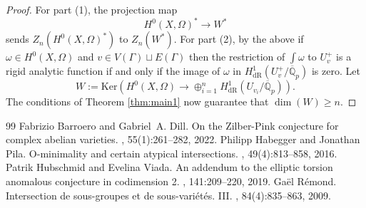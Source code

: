 \documentclass[10pt,a4paper]{amsart}
\newcommand{\Ker}{\mathrm{Ker}}
\def\Q{\mathbb Q}
\newcommand{\dR}{\mathrm{dR}}
\begin{document}
\begin{proof}
For part (1), the projection map
\[
H^0 (X,\Omega )^* \to W^*
\]
sends $Z_n (H^0 (X,\Omega )^* )$ to $Z_n (W^* )$. For part (2), by the above if $\omega \in H^0 (X,\Omega )$ and $v\in V(\Gamma )\sqcup E(\Gamma )$ then the restriction of $\int \omega $ to $U_v ^+$ is a rigid analytic function if and only if the image of $\omega $ in $H^1 _{\dR}(U_v ^+ /\overline{\Q }_p )$ is zero. Let 
\[
W:=\Ker (H^0 (X,\Omega )\to \oplus _{i=1}^n H^1 _{\dR}(U_{v_i }/\overline{\Q }_p )).
\]
The conditions of Theorem \ref{thm:main1} now guarantee that $\dim (W)\geq n$.
\end{proof}

\begin{thebibliography}{99}
 Fabrizio Barroero and Gabriel~A. Dill. \newblock On the {Z}ilber-{P}ink conjecture for complex abelian varieties. , 55(1):261--282, 2022.
 Philipp Habegger and Jonathan Pila. \newblock O-minimality and certain atypical intersections. , 49(4):813--858, 2016.
 Patrik Hubschmid and Evelina Viada. \newblock An addendum to the elliptic torsion anomalous conjecture in codimension 2. , 141:209--220, 2019.
 Ga\"{e}l R\'{e}mond. \newblock Intersection de sous-groupes et de sous-vari\'{e}t\'{e}s. {III}. , 84(4):835--863, 2009.
\end{thebibliography}
\end{document}
